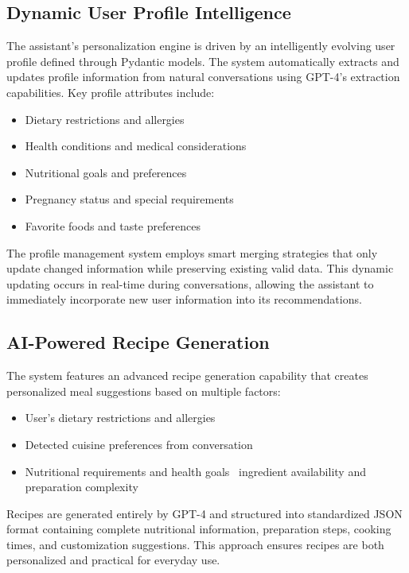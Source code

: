 \subsection{Dynamic User Profile Intelligence}
The assistant's personalization engine is driven by an intelligently evolving user profile defined through Pydantic models. The system automatically extracts and updates profile information from natural conversations using GPT-4's extraction capabilities. Key profile attributes include:
\begin{itemize}
\item Dietary restrictions and allergies
\item Health conditions and medical considerations
\item Nutritional goals and preferences
\item Pregnancy status and special requirements
\item Favorite foods and taste preferences
\end{itemize}

The profile management system employs smart merging strategies that only update changed information while preserving existing valid data. This dynamic updating occurs in real-time during conversations, allowing the assistant to immediately incorporate new user information into its recommendations.

\subsection{AI-Powered Recipe Generation}
The system features an advanced recipe generation capability that creates personalized meal suggestions based on multiple factors:
\begin{itemize}
\item User's dietary restrictions and allergies
\item Detected cuisine preferences from conversation
\item Nutritional requirements and health goals
\ ingredient availability and preparation complexity
\end{itemize}

Recipes are generated entirely by GPT-4 and structured into standardized JSON format containing complete nutritional information, preparation steps, cooking times, and customization suggestions. This approach ensures recipes are both personalized and practical for everyday use.

